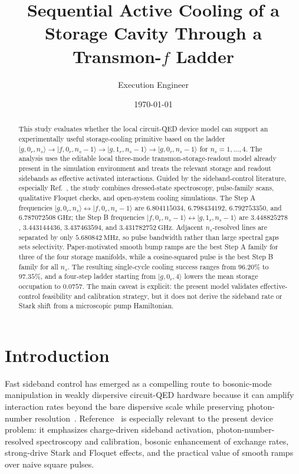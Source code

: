 \documentclass[aps,pra,twocolumn,reprint,floatfix,amsmath,amssymb]{revtex4-2}
\newcommand{\ket}[1]{\lvert #1 \rangle}
\begin{document}
\title{Sequential Active Cooling of a Storage Cavity Through a Transmon-\(f\) Ladder}
\author{Execution Engineer}
\date{\today}

\begin{abstract}
This study evaluates whether the local circuit-QED device model can support an experimentally useful storage-cooling primitive based on the ladder \(\ket{g,0_r,n_s}\rightarrow\ket{f,0_r,n_s-1}\rightarrow\ket{g,1_r,n_s-1}\rightarrow\ket{g,0_r,n_s-1}\) for \(n_s=1,\ldots,4\). The analysis uses the editable local three-mode transmon-storage-readout model already present in the simulation environment and treats the relevant storage and readout sidebands as effective activated interactions. Guided by the sideband-control literature, especially Ref.~, the study combines dressed-state spectroscopy, pulse-family scans, qualitative Floquet checks, and open-system cooling simulations. The Step A frequencies \(\ket{g,0_r,n_s}\leftrightarrow\ket{f,0_r,n_s-1}\) are \(6.804115034\), \(6.798434192\), \(6.792753350\), and \(6.787072508~\si{\giga\hertz}\); the Step B frequencies \(\ket{f,0_r,n_s-1}\leftrightarrow\ket{g,1_r,n_s-1}\) are \(3.448825278\), \(3.443144436\), \(3.437463594\), and \(3.431782752~\si{\giga\hertz}\). Adjacent \(n_s\)-resolved lines are separated by only \(5.680842~\si{\mega\hertz}\), so pulse bandwidth rather than large spectral gaps sets selectivity. Paper-motivated smooth bump ramps are the best Step A family for three of the four storage manifolds, while a cosine-squared pulse is the best Step B family for all \(n_s\). The resulting single-cycle cooling success ranges from \(96.20\%\) to \(97.35\%\), and a four-step ladder starting from \(\ket{g,0_r,4}\) lowers the mean storage occupation to \(0.0757\). The main caveat is explicit: the present model validates effective-control feasibility and calibration strategy, but it does not derive the sideband rate or Stark shift from a microscopic pump Hamiltonian.
\end{abstract}

\maketitle

\section{Introduction}
Fast sideband control has emerged as a compelling route to bosonic-mode manipulation in weakly dispersive circuit-QED hardware because it can amplify interaction rates beyond the bare dispersive scale while preserving photon-number resolution~\cite{blais2021circuit,huang2025fastsideband}. Reference~ is especially relevant to the present device problem: it emphasizes charge-driven sideband activation, photon-number-resolved spectroscopy and calibration, bosonic enhancement of exchange rates, strong-drive Stark and Floquet effects, and the practical value of smooth ramps over naive square pulses.
\end{document}
